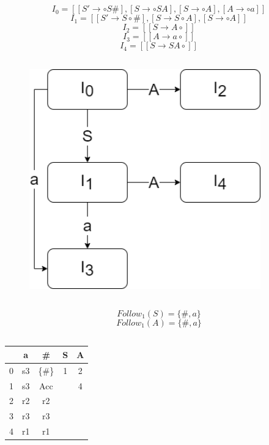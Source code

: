 \documentclass[a4paper,10pt]{jsarticle}
\begin{document}
\section{}
\subsection{}
\[I_0=[[S'\rightarrow\circ S\#],[S\rightarrow\circ SA],[S\rightarrow\circ A],[A\rightarrow\circ a]] \]
\[I_1=[[S'\rightarrow S\circ\#],[S\rightarrow S\circ A],[S\rightarrow\circ A]]\]
\[I_2=[[S\rightarrow A\circ] ]\]
\[I_3=[[A\rightarrow a\circ]] \]
\[I_4=[[S\rightarrow SA\circ] ]\]

\subsection{}
\begin{figure}[H]
  \centering
  \includegraphics[width=10cm]{./01.png}
\end{figure}

\subsection{}
\[Follow_1(S)=\{\#,a\}\]
\[Follow_1(A)=\{\#,a\}\]

\subsection{}
\begin{table}[htb]
  \centering
  \begin{tabular}{c|c|c|c|c}
    & a  & \#     & S & A \\ \hline
  0 & s3 & \{\#\} & 1 & 2 \\
  1 & s3 & Acc    &   & 4 \\
  2 & r2 & r2     &   &   \\
  3 & r3 & r3     &   &   \\
  4 & r1 & r1     &   &  
  \end{tabular}
\end{table}
\end{document}

